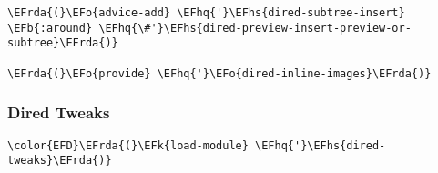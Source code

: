 \documentclass[a4wide,10pt]{article}
\newcommand{\EFk}[1]{\textcolor{EFk}{#1}} %
\newcommand{\EFb}[1]{\textcolor{EFb}{#1}} %
\newcommand{\EFo}[1]{\textcolor{EFo}{#1}} %
\newcommand{\EFhq}[1]{\textcolor{EFhq}{#1}} %
\newcommand{\EFhs}[1]{\textcolor{EFhs}{#1}} %
\newcommand{\EFrda}[1]{\textcolor{EFrda}{#1}} %
\begin{document}
\begin{Code}
\begin{Verbatim}
\EFrda{(}\EFo{advice-add} \EFhq{'}\EFhs{dired-subtree-insert} \EFb{:around} \EFhq{\#'}\EFhs{dired-preview-insert-preview-or-subtree}\EFrda{)}

\EFrda{(}\EFo{provide} \EFhq{'}\EFo{dired-inline-images}\EFrda{)}

\end{Verbatim}
\end{Code}

\subsubsection{Dired Tweaks}
\label{sec:org7c7fd41}
\begin{Code}
\begin{Verbatim}
\color{EFD}\EFrda{(}\EFk{load-module} \EFhq{'}\EFhs{dired-tweaks}\EFrda{)}
\end{Verbatim}
\end{Code}
\end{document}

